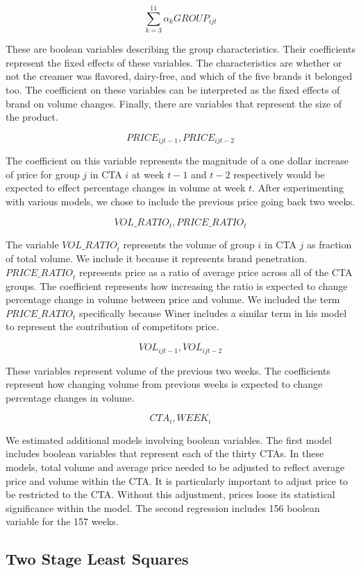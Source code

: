 \documentclass{article}
\begin{document}
$$ \sum_{k=3}^{11} \alpha_k {GROUP}_{ijt} $$ 

These are boolean variables describing the group characteristics. Their coefficients represent the fixed effects of these variables. The characteristics are whether or not the creamer was flavored, dairy-free, and which of the five brands it belonged too.  The coefficient on these variables can be interpreted as the fixed effects of brand on volume changes. Finally, there are variables that represent the size of the product.

$${PRICE}_{ijt-1}, {PRICE}_{ijt-2} $$

The coefficient on this variable represents the magnitude of a one dollar increase of price for group $j$ in CTA $i$ at week $t-1$ and $t-2$ respectively would be expected to effect percentage changes in volume at week $t$. After experimenting with various models, we chose to include the previous price going back two weeks.

$${VOL\_RATIO}_t, {PRICE\_RATIO}_{t} $$ 

The variable $ {VOL\_RATIO}_t $ represents the volume of group $i$ in CTA $j$ as fraction of total volume. We include it because it represents brand penetration.  ${PRICE\_RATIO}_{t} $ represents price as a ratio of average price across all of the CTA groups. The coefficient represents how increasing the ratio is expected to change percentage change in volume between price and volume. We included the term ${PRICE\_RATIO}_{t}$  specifically because Winer includes a similar term in his model to represent the contribution of competitors price.

$${VOL}_{ijt-1}, {VOL}_{ijt-2} $$

These variables represent volume of the previous two weeks. The coefficients represent how changing volume from previous weeks is expected to change percentage changes in volume.

$$ CTA_i, WEEK_{i}$$

We estimated additional models involving boolean variables. The first model includes boolean variables that represent each of the thirty CTAs. In these models, total volume and average price needed to be adjusted to reflect average price and volume within the CTA. It is particularly important to adjust price to be restricted to the CTA. Without this adjustment, prices loose its statistical significance within the model. The second regression includes 156 boolean variable for the 157 weeks.

\subsection{Two Stage Least Squares}
\end{document}
